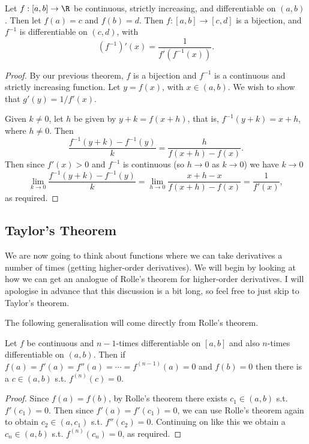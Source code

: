\begin{theorem}
	Let $f:[a, b] \rightarrow \R$ be continuous, strictly increasing, and differentiable on $(a, b)$.
	Then let $f(a) = c$ and $f(b) = d$. Then $f:[a, b] \rightarrow [c, d]$ is a bijection, and $f^{-1}$ is differentiable on $(c, d)$, with
	$$
	(f^{-1})'(x) = \frac{1}{f'(f^{-1}(x))}.
	$$
\end{theorem}
\begin{proof}
	By our previous theorem, $f$ is a bijection and $f^{-1}$ is a continuous and strictly increasing function. Let $y = f(x)$, with $x \in (a, b)$. We wish to show that $g'(y) = 1/f'(x)$.

	Given $k \neq 0$, let $h$ be given by $y + k = f(x + h)$, that is, $f^{-1}(y + k) = x + h$, where $h \neq 0$. Then
	$$
	\frac{f^{-1}(y + k) - f^{-1}(y)}{k} = \frac{h}{f(x + h) - f(x)}.
	$$
	Then since $f'(x) > 0$ and $f^{-1}$ is continuous (so $h \rightarrow 0$ as $k \rightarrow 0$) we have $k \to 0$ 
	$$
	\lim_{k \to 0} \frac{f^{-1}(y + k) - f^{-1}(y)}{k} = \lim_{h \to 0} \frac{x + h - x}{f(x + h) - f(x)} = \frac{1}{f'(x)},
	$$
	as required.
\end{proof}

\subsection{Taylor's Theorem}

We are now going to think about functions where we can take derivatives a number of times (getting higher-order derivatives).
We will begin by looking at how we can get an analogue of Rolle's theorem for higher-order derivatives. I will apologise in advance that this discussion is a bit long, so feel free to just skip to Taylor's theorem.

The following generalisation will come directly from Rolle's theorem.
\begin{theorem}
	Let $f$ be continuous and $n-1$-times differentiable on $[a, b]$ and also $n$-times differentiable on $(a, b)$. Then if $f(a) = f'(a) = f''(a) = \cdots = f^{(n - 1)}(a) = 0$ and $f(b) = 0$ then there is a $c \in (a, b)$ s.t. $f^{(n)}(c) = 0$.
\end{theorem}
\begin{proof}
	Since $f(a) = f(b)$, by Rolle's theorem there exists $c_1 \in (a, b)$ s.t. $f'(c_1) = 0$. Then since $f'(a) = f'(c_1) = 0$, we can use Rolle's theorem again to obtain $c_2 \in (a, c_1)$ s.t. $f''(c_2) = 0$. Continuing on like this we obtain a $c_{n} \in (a, b)$ s.t. $f^{(n)}(c_n) = 0$, as required.
\end{proof}

